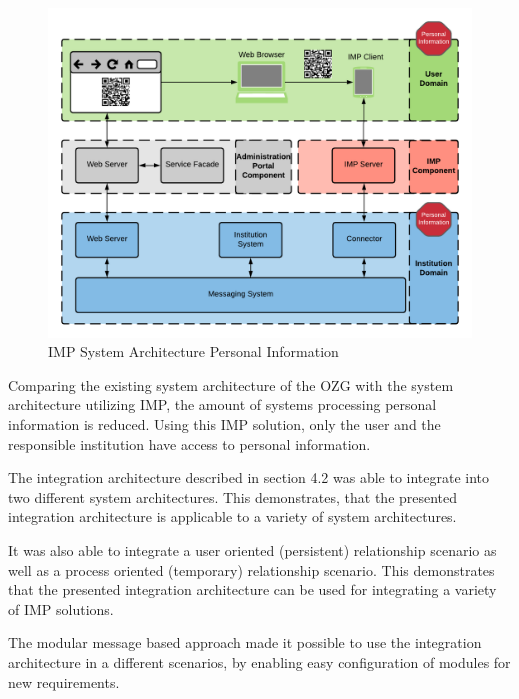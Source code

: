 \begin{figure}[h]
    \centering
    \includegraphics[scale=0.6]{Diagrams/Integration Architecture 2/IMP Personal Information.pdf}
    \caption{IMP System Architecture Personal Information}
    \label{integration2:imp_personal_information}
\end{figure}

Comparing the existing system architecture of the OZG with the system architecture utilizing IMP, the amount of systems processing personal information is reduced. Using this IMP solution, only the user and the responsible institution have access to personal information.

The integration architecture described in section 4.2 was able to integrate into two different system architectures. This demonstrates, that the presented integration architecture is applicable to a variety of system architectures.

It was also able to integrate a user oriented (persistent) relationship scenario as well as a process oriented (temporary) relationship scenario. This demonstrates that the presented integration architecture can be used for integrating a variety of IMP solutions.

The modular message based approach made it possible to use the integration architecture in a different scenarios, by enabling easy configuration of modules for new requirements.
